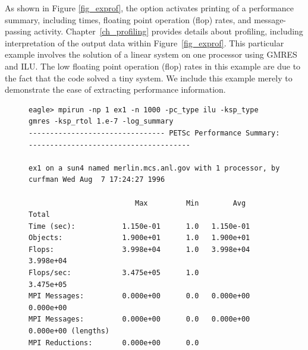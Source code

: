 As shown in Figure \ref{fig_exprof}, the option  activates printing of a performance summary, including
times, floating point operation (flop) rates, and message-passing
activity.  Chapter~\ref{ch_profiling}
provides details about profiling, including interpretation of the
output data within Figure~\ref{fig_exprof}.  This particular example involves the solution of a linear
system on one processor using GMRES and ILU.  The low floating point
operation (flop) rates in this example are due to the fact that the
code solved a tiny system.  We include this example merely to
demonstrate the ease of extracting performance information.

\begin{figure}[H]
{\footnotesize
\begin{verbatim}
eagle> mpirun -np 1 ex1 -n 1000 -pc_type ilu -ksp_type gmres -ksp_rtol 1.e-7 -log_summary
-------------------------------- PETSc Performance Summary: --------------------------------------

ex1 on a sun4 named merlin.mcs.anl.gov with 1 processor, by curfman Wed Aug  7 17:24:27 1996

                         Max         Min        Avg        Total 
Time (sec):           1.150e-01      1.0   1.150e-01
Objects:              1.900e+01      1.0   1.900e+01
Flops:                3.998e+04      1.0   3.998e+04  3.998e+04
Flops/sec:            3.475e+05      1.0              3.475e+05
MPI Messages:         0.000e+00      0.0   0.000e+00  0.000e+00
MPI Messages:         0.000e+00      0.0   0.000e+00  0.000e+00 (lengths)
MPI Reductions:       0.000e+00      0.0


\end{verbatim}}
\end{figure}

